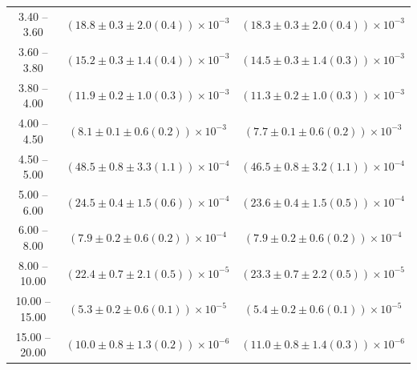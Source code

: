 \begin{table}
\begin{center}
\begin{tabular}{ c | c c }
3.40 -- 3.60 & $(18.8\pm0.3\pm2.0(0.4))\times10^{-3}$ & $(18.3\pm0.3\pm2.0(0.4))\times10^{-3}$ \\ 
3.60 -- 3.80 & $(15.2\pm0.3\pm1.4(0.4))\times10^{-3}$ & $(14.5\pm0.3\pm1.4(0.3))\times10^{-3}$ \\ 
3.80 -- 4.00 & $(11.9\pm0.2\pm1.0(0.3))\times10^{-3}$ & $(11.3\pm0.2\pm1.0(0.3))\times10^{-3}$ \\ 
4.00 -- 4.50 & $(8.1\pm0.1\pm0.6(0.2))\times10^{-3}$ & $(7.7\pm0.1\pm0.6(0.2))\times10^{-3}$ \\ 
4.50 -- 5.00 & $(48.5\pm0.8\pm3.3(1.1))\times10^{-4}$ & $(46.5\pm0.8\pm3.2(1.1))\times10^{-4}$ \\ 
5.00 -- 6.00 & $(24.5\pm0.4\pm1.5(0.6))\times10^{-4}$ & $(23.6\pm0.4\pm1.5(0.5))\times10^{-4}$ \\ 
6.00 -- 8.00 & $(7.9\pm0.2\pm0.6(0.2))\times10^{-4}$ & $(7.9\pm0.2\pm0.6(0.2))\times10^{-4}$ \\ 
8.00 -- 10.00 & $(22.4\pm0.7\pm2.1(0.5))\times10^{-5}$ & $(23.3\pm0.7\pm2.2(0.5))\times10^{-5}$ \\ 
10.00 -- 15.00 & $(5.3\pm0.2\pm0.6(0.1))\times10^{-5}$ & $(5.4\pm0.2\pm0.6(0.1))\times10^{-5}$ \\ 
15.00 -- 20.00 & $(10.0\pm0.8\pm1.3(0.2))\times10^{-6}$ & $(11.0\pm0.8\pm1.4(0.3))\times10^{-6}$ \\ 
\hline
\end{tabular}
\end{center}
\end{table}
 
